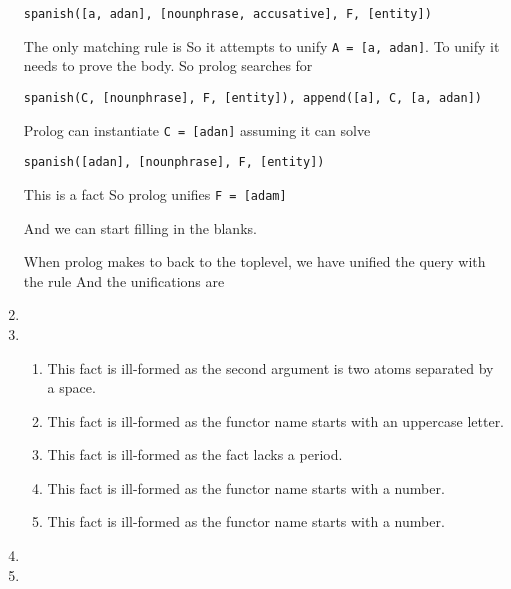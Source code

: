 \documentclass[12pt,letterpaper]{article}
\begin{document}
\begin{enumerate}
      \texttt{spanish([a, adan], [nounphrase, accusative], F, [entity])}

      The only matching rule is
      So it attempts to unify \texttt{A = [a, adan]}.
      To unify it needs to prove the body.
      So prolog searches for

      \texttt{spanish(C, [nounphrase], F, [entity]), append([a], C, [a, adan])}

      Prolog can instantiate \texttt{C = [adan]} assuming it can solve

      \texttt{spanish([adan], [nounphrase], F, [entity])}

      This is a fact
      So prolog unifies \texttt{F = [adam]}

      And we can start filling in the blanks.

      When prolog makes to back to the toplevel, we have unified the query with the rule
      And the unifications are

    \item
    \item
      \begin{enumerate}
        \item This fact is ill-formed as the second argument is two atoms separated by a space.
        \item This fact is ill-formed as the functor name starts with an uppercase letter.
        \item This fact is ill-formed as the fact lacks a period.
        \item This fact is ill-formed as the functor name starts with a number.
        \item This fact is ill-formed as the functor name starts with a number.
      \end{enumerate}

    \pagebreak

    \item
    \item
  \end{enumerate}
\end{document}
